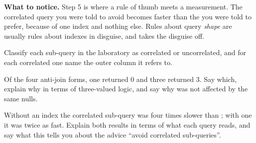 \begin{lab}
\smallskip
\textbf{What to notice.} Step 5 is where a rule of thumb meets a measurement.
The correlated query you were told to avoid becomes faster than the
 you were told to prefer, because of one index and nothing
else. Rules about query \emph{shape} are usually rules about indexes in
disguise, and  takes the disguise off.
\end{lab}

\begin{checkpoint}
\begin{tightnum}
  \item Classify each sub-query in the laboratory as correlated or
        uncorrelated, and for each correlated one name the outer column it
        refers to.
  \item Of the four anti-join forms, one returned 0 and three returned 3. Say
        which, explain why in terms of three-valued logic, and say why
         was not affected by the same nulls.
  \item Without an index the correlated sub-query was four times slower than
        ; with one it was twice as fast. Explain both results
        in terms of what each query reads, and say what this tells you about
        the advice ``avoid correlated sub-queries''.
\end{tightnum}
\end{checkpoint}

